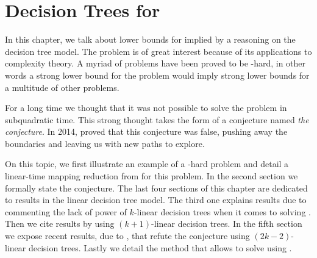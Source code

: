 \chapter{Decision Trees for \threeSUM}
\label{tree:3sum}

In this chapter, we talk about lower bounds for \threeSUM implied by a
reasoning on the decision tree model. The \threeSUM problem is of great
interest because of its applications to complexity theory. A myriad of problems
have been proved to be \threeSUM-hard, in other words a strong lower bound for
the \threeSUM problem would imply strong lower bounds for a multitude of other
problems.

For a long time we thought that it was not possible to solve the \threeSUM
problem in subquadratic time. This strong thought takes the form of a
conjecture named \emph{the \threeSUM conjecture}. In 2014, \citet*{gronlund:2014}
proved that this conjecture was false, pushing away the
boundaries and leaving us with new paths to explore.

On this topic, we first illustrate an example of a \threeSUM-hard problem
and detail a linear-time mapping reduction from \threeSUM for this problem. In
the second section we formally state the \threeSUM conjecture. The last
four sections of this chapter are dedicated to results in the linear
decision tree model. The third one explains results due to
\citet*{erickson:1999} commenting the lack of power of $k$-linear decision
trees when it comes to solving \ksum. Then we cite results by
\citet*{ailon:2005} using $(k+1)$-linear decision trees. In the fifth section
we expose recent results, due to \citet*{gronlund:2014}, that refute
the \threeSUM conjecture using $(2k-2)$-linear decision trees. Lastly we
detail the method that allows to solve \kLDT using \threeSUM.
